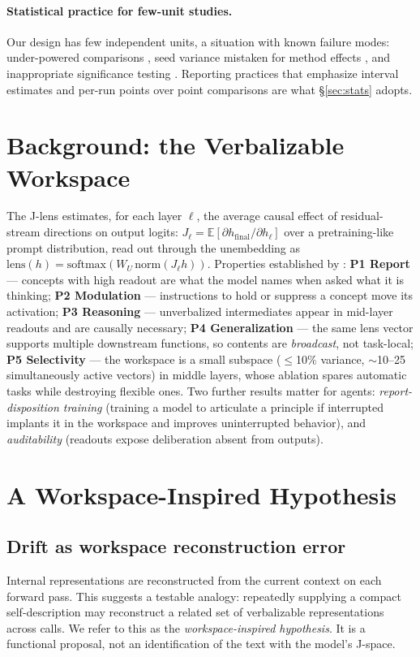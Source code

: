 \documentclass[11pt]{article}
\newcommand{\jlens}{J\mbox{-}lens}
\begin{document}
\paragraph{Statistical practice for few-unit studies.} Our design has few independent units, a situation with known failure modes: under-powered comparisons \citep{card2020power}, seed variance mistaken for method effects \citep{henderson2018deeprl,bouthillier2021variance}, and inappropriate significance testing \citep{dror2018hitchhiker}. Reporting practices that emphasize interval estimates and per-run points over point comparisons \citep{agarwal2021precipice} are what \S\ref{sec:stats} adopts.

\section{Background: the Verbalizable Workspace}
\label{sec:background}
The \jlens{} estimates, for each layer $\ell$, the average causal effect of residual-stream directions on output logits: $J_\ell = \mathbb{E}\!\left[\partial h_{\mathrm{final}}/\partial h_\ell\right]$ over a pretraining-like prompt distribution, read out through the unembedding as $\mathrm{lens}(h)=\mathrm{softmax}(W_U\,\mathrm{norm}(J_\ell h))$. Properties established by \citet{gurnee2026}: \textbf{P1 Report} --- concepts with high readout are what the model names when asked what it is thinking; \textbf{P2 Modulation} --- instructions to hold or suppress a concept move its activation; \textbf{P3 Reasoning} --- unverbalized intermediates appear in mid-layer readouts and are causally necessary; \textbf{P4 Generalization} --- the same lens vector supports multiple downstream functions, so contents are \emph{broadcast}, not task-local; \textbf{P5 Selectivity} --- the workspace is a small subspace ($\leq$10\% variance, $\sim$10--25 simultaneously active vectors) in middle layers, whose ablation spares automatic tasks while destroying flexible ones. Two further results matter for agents: \emph{report-disposition training} (training a model to articulate a principle if interrupted implants it in the workspace and improves uninterrupted behavior), and \emph{auditability} (readouts expose deliberation absent from outputs).

\section{A Workspace-Inspired Hypothesis}
\label{sec:argument}
\subsection{Drift as workspace reconstruction error}
Internal representations are reconstructed from the current context on each forward pass. This suggests a testable analogy: repeatedly supplying a compact self-description may reconstruct a related set of verbalizable representations across calls. We refer to this as the \emph{workspace-inspired hypothesis}. It is a functional proposal, not an identification of the text with the model's J-space.
\end{document}
